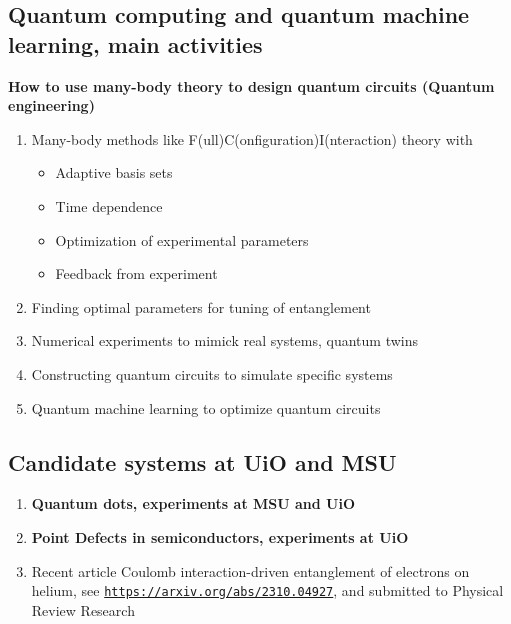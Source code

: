 \documentclass[%
oneside,                 %
final,                   %
10pt]{article}
\begin{document}
\noindent
\subsection{Quantum computing and quantum machine learning, main activities}

\textbf{How to use many-body theory to design quantum circuits (Quantum engineering)}
\begin{enumerate}
\item Many-body methods like F(ull)C(onfiguration)I(nteraction) theory  with
\begin{itemize}

  \item Adaptive basis sets 

  \item Time dependence

  \item Optimization of experimental parameters 

  \item Feedback from experiment

\end{itemize}

\noindent
\item Finding optimal parameters for tuning of entanglement 

\item Numerical experiments to mimick real systems, quantum twins

\item Constructing quantum circuits to simulate specific systems

\item Quantum machine learning to optimize quantum circuits
\end{enumerate}

\noindent
\subsection{Candidate systems at UiO and MSU}

\begin{block}{}
\begin{enumerate}
\item \textbf{Quantum dots, experiments at MSU and UiO}

\item \textbf{Point Defects in semiconductors, experiments at UiO}

\item Recent article Coulomb interaction-driven entanglement of electrons on helium, see \href{{https://arxiv.org/abs/2310.04927}}{\nolinkurl{https://arxiv.org/abs/2310.04927}}, and submitted to Physical Review Research
\end{enumerate}

\noindent
\end{block}
\end{document}

